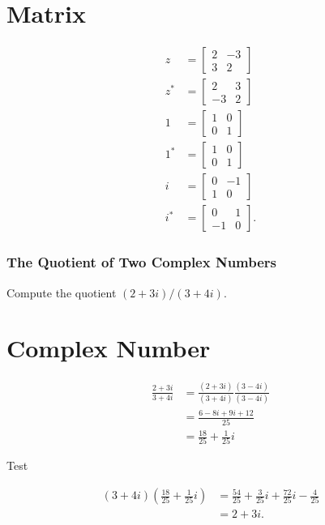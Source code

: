\section{Matrix}
$$
\begin{aligned}
z & =\left[\begin{array}{cc}
2 & -3 \\
3 & 2
\end{array}\right] \\
z^{*} & =\left[\begin{array}{cc}
2 & 3 \\
-3 & 2
\end{array}\right] \\
1 & =\left[\begin{array}{ll}
1 & 0 \\
0 & 1
\end{array}\right] \\
1^{*} & =\left[\begin{array}{ll}
1 & 0 \\
0 & 1
\end{array}\right] \\
i & =\left[\begin{array}{cc}
0 & -1 \\
1 & 0
\end{array}\right] \\
i^{*} & =\left[\begin{array}{cc}
0 & 1 \\
-1 & 0
\end{array}\right] .
\end{aligned}
$$

\subsubsection{The Quotient of Two Complex Numbers}
Compute the quotient $(2+3 i) /(3+4 i)$.

\section{Complex Number}
$$
\begin{aligned}
\frac{2+3 i}{3+4 i} & =\frac{(2+3 i)}{(3+4 i)} \frac{(3-4 i)}{(3-4 i)} \\
& =\frac{6-8 i+9 i+12}{25} \\
& =\frac{18}{25}+\frac{1}{25} i
\end{aligned}
$$

Test

$$
\begin{aligned}
(3+4 i)\left(\frac{18}{25}+\frac{1}{25} i\right) & =\frac{54}{25}+\frac{3}{25} i+\frac{72}{25} i-\frac{4}{25} \\
& =2+3 i .
\end{aligned}
$$

